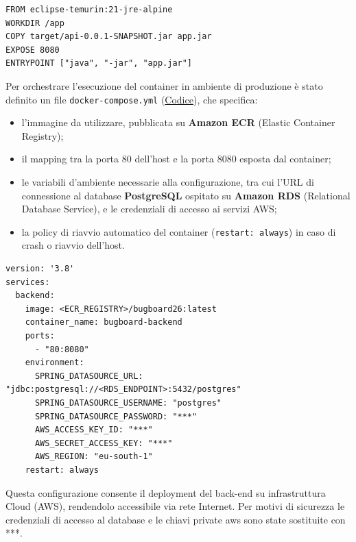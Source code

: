 \documentclass[a4paper,12pt]{article}
\begin{document}
\begin{lstlisting}[caption={Docker File}, label={lst:dockerfile}]
FROM eclipse-temurin:21-jre-alpine
WORKDIR /app
COPY target/api-0.0.1-SNAPSHOT.jar app.jar
EXPOSE 8080
ENTRYPOINT ["java", "-jar", "app.jar"]
\end{lstlisting}

Per orchestrare l'esecuzione del container in ambiente di produzione è stato definito un file \texttt{docker-compose.yml} (\hyperref[lst:dockercompose]{Codice}), che specifica:
\begin{itemize}
    \item l'immagine da utilizzare, pubblicata su \textbf{Amazon ECR} (Elastic Container Registry);
    \item il mapping tra la porta 80 dell'host e la porta 8080 esposta dal container;
    \item le variabili d'ambiente necessarie alla configurazione, tra cui l'URL di connessione al database \textbf{PostgreSQL} ospitato su \textbf{Amazon RDS} (Relational Database Service), e le credenziali di accesso ai servizi AWS;  
    \item la policy di riavvio automatico del container (\texttt{restart: always}) in caso di crash o riavvio dell'host.
\end{itemize}

\begin{lstlisting}[caption={Docker Compose per il deployment del back-end}, label={lst:dockercompose}]
version: '3.8'
services:
  backend:
    image: <ECR_REGISTRY>/bugboard26:latest
    container_name: bugboard-backend
    ports:
      - "80:8080"
    environment:
      SPRING_DATASOURCE_URL: "jdbc:postgresql://<RDS_ENDPOINT>:5432/postgres"
      SPRING_DATASOURCE_USERNAME: "postgres"
      SPRING_DATASOURCE_PASSWORD: "***"
      AWS_ACCESS_KEY_ID: "***"
      AWS_SECRET_ACCESS_KEY: "***"
      AWS_REGION: "eu-south-1"
    restart: always
\end{lstlisting}

Questa configurazione consente il deployment del back-end su infrastruttura Cloud (AWS), rendendolo accessibile via rete Internet. Per motivi di sicurezza le credenziali di accesso al database e le chiavi private aws sono state sostituite con ***.
\end{document}
